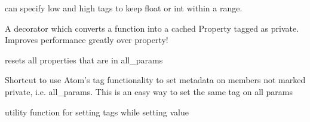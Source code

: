 \documentclass[letterpaper,10pt,english]{sphinxmanual}
\begin{document}

\begin{fulllineitems}
\label{core_doc/atom_extension:taref.core.atom_extension.lowhigh_check}
can specify low and high tags to keep float or int within a range.

\end{fulllineitems}


\begin{fulllineitems}
\label{core_doc/atom_extension:taref.core.atom_extension.private_property}
A decorator which converts a function into a cached Property tagged as private.
Improves performance greatly over property!

\end{fulllineitems}


\begin{fulllineitems}
\label{core_doc/atom_extension:taref.core.atom_extension.reset_properties}
resets all  properties that are in all\_params

\end{fulllineitems}


\begin{fulllineitems}
\label{core_doc/atom_extension:taref.core.atom_extension.set_all_tags}
Shortcut to use Atom's tag functionality to set metadata on members not marked private, i.e. all\_params. This is an easy way to set the same tag on all params

\end{fulllineitems}


\begin{fulllineitems}
\label{core_doc/atom_extension:taref.core.atom_extension.set_attr}
utility function for setting tags while setting value

\end{fulllineitems}
\end{document}
